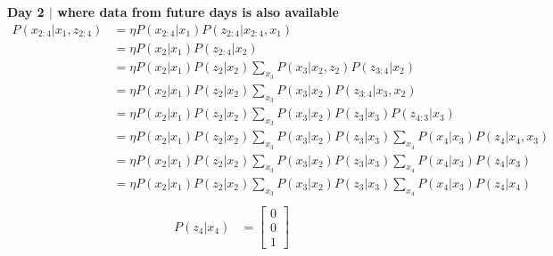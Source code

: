 \documentclass[answers]{exam}
\begin{document}
\begin{questions}
\begin{parts}
\begin{solution}
            \textbf{Day 2 $\mid$ where data from future days is also available}
            \begin{align*}
                P(x_{2:4} | x_1, z_{2:4}) & = \eta P(x_{2:4} | x_1) P(z_{2:4} | x_{2:4}, x_1)                                                                   \\
                                          & = \eta P(x_{2} | x_1) P(z_{2:4} | x_2)                                                                              \\
                                          & = \eta P(x_{2} | x_1) P(z_{2} | x_2) \sum_{x_3} P(x_3 | x_2, z_2) P(z_{3:4} | x_2)                                  \\
                                          & = \eta P(x_{2} | x_1) P(z_{2} | x_2) \sum_{x_3} P(x_3 | x_2) P(z_{3:4} | x_3, x_2)                                  \\
                                          & = \eta P(x_{2} | x_1) P(z_{2} | x_2) \sum_{x_3} P(x_3 | x_2) P(z_3 | x_3) P(z_{4:3} | x_3)                          \\
                                          & = \eta P(x_{2} | x_1) P(z_{2} | x_2) \sum_{x_3} P(x_3 | x_2) P(z_3 | x_3) \sum_{x_4} P(x_4 | x_3) P(z_4 | x_4, x_3) \\
                                          & = \eta P(x_{2} | x_1) P(z_{2} | x_2) \sum_{x_3} P(x_3 | x_2) P(z_3 | x_3) \sum_{x_4} P(x_4 | x_3) P(z_4 | x_3)      \\
                                          & = \eta P(x_{2} | x_1) P(z_{2} | x_2) \sum_{x_3} P(x_3 | x_2) P(z_3 | x_3) \sum_{x_4} P(x_4 | x_3) P(z_4 | x_4)      \\
            \end{align*}
            \begin{align*}
                P(z_4 | x_4)                                                                                    & = \begin{bmatrix}
                                                                                                                        0 \\
                                                                                                                        0 \\
                                                                                                                        1

\end{bmatrix}
\end{align*}
\end{solution}
\end{parts}
\end{questions}
\end{document}
